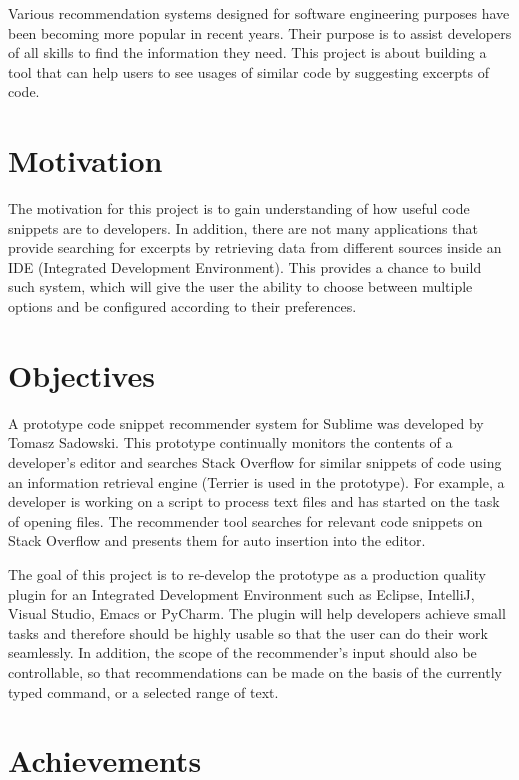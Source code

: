 \documentclass{l4proj}
\begin{document}
\noindent
Various recommendation systems designed for software engineering purposes have been becoming more popular in recent years. Their purpose is to assist developers of all skills to find the information they need. This project is about building a tool that can help users to see usages of similar code by suggesting excerpts of code.

\section{Motivation}

The motivation for this project is to gain understanding of how useful code snippets are to developers. In addition, there are not many applications that provide searching for excerpts by retrieving data from different sources inside an IDE (Integrated Development Environment). This provides a chance to build such system, which will give the user the ability to choose between multiple options and be configured according to their preferences.

\section{Objectives}

A prototype code snippet recommender system for Sublime was developed by Tomasz Sadowski. This prototype continually monitors the contents of a developer's editor and searches Stack Overflow for similar snippets of code using an information retrieval engine (Terrier is used in the prototype). For example, a developer is working on a script to process text files and has started on the task of opening files. The recommender tool searches for relevant code snippets on Stack Overflow and presents them for auto insertion into the editor.

\noindent
The goal of this project is to re-develop the prototype as a production quality plugin for an Integrated Development Environment such as Eclipse, IntelliJ, Visual Studio, Emacs or PyCharm. The plugin will help developers achieve small tasks and therefore should be highly usable so that the user can do their work seamlessly. In addition, the scope of the recommender's input should also be controllable, so that recommendations can be made on the basis of the currently typed command, or a selected range of text.

\section{Achievements}
\end{document}
